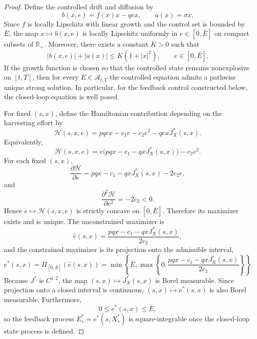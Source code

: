 \documentclass[10pt,a4paper]{amsart}
\begin{document}
	\begin{proof}
		Define the controlled drift and diffusion by
		\[
		b(x,e)=f(x)x-qex,
		\qquad
		a(x)=\sigma x.
		\]
		Since $f$ is locally Lipschitz with linear growth and the control set is bounded by $\bar E$, the map $x\mapsto b(x,e)$ is locally Lipschitz uniformly in $e\in[0,\bar E]$ on compact subsets of $\mathbb{R}_+$. Moreover, there exists a constant $K>0$ such that
		\[
		|b(x,e)|+|a(x)|
		\le
		K(1+|x|^2),
		\qquad e\in[0,\bar E].
		\]
		If the growth function is chosen so that the controlled state remains nonexplosive on $[t,T]$, then for every $E\in\mathcal{A}_{t,T}$ the controlled equation admits a pathwise unique strong solution. In particular, for the feedback control constructed below, the closed-loop equation is well posed.
		
		For fixed $(s,x)$, define the Hamiltonian contribution depending on the harvesting effort by
		\[
		\mathcal{H}(s,x,e)
		=
		pqex-c_1e-c_2e^2-qexJ_X^*(s,x).
		\]
		Equivalently,
		\[
		\mathcal{H}(s,x,e)
		=
		e\bigl(pqx-c_1-qxJ_X^*(s,x)\bigr)-c_2e^2.
		\]
		For each fixed $(s,x)$,
		\[
		\frac{\partial \mathcal{H}}{\partial e}
		=
		pqx-c_1-qxJ_X^*(s,x)-2c_2e,
		\]
		and
		\[
		\frac{\partial^2 \mathcal{H}}{\partial e^2}
		=
		-2c_2<0.
		\]
		Hence $e\mapsto\mathcal{H}(s,x,e)$ is strictly concave on $[0,\bar E]$. Therefore its maximizer exists and is unique. The unconstrained maximizer is
		\[
		\widehat e(s,x)
		=
		\frac{pqx-c_1-qxJ_X^*(s,x)}{2c_2},
		\]
		and the constrained maximizer is its projection onto the admissible interval,
		\[
		e^*(s,x)
		=
		\Pi_{[0,\bar E]}(\widehat e(s,x))
		=
		\min
		\left\{
		\bar E,
		\max
		\left\{
		0,
		\frac{pqx-c_1-qxJ_X^*(s,x)}{2c_2}
		\right\}
		\right\}.
		\]
		Because $J^*$ is $C^{1,2}$, the map $(s,x)\mapsto J_X^*(s,x)$ is Borel measurable. Since projection onto a closed interval is continuous, $(s,x)\mapsto e^*(s,x)$ is also Borel measurable. Furthermore,
		\[
		0\le e^*(s,x)\le \bar E,
		\]
		so the feedback process $E_s^*=e^*(s,X_s^*)$ is square-integrable once the closed-loop state process is defined.
		

\end{proof}
\end{document}

